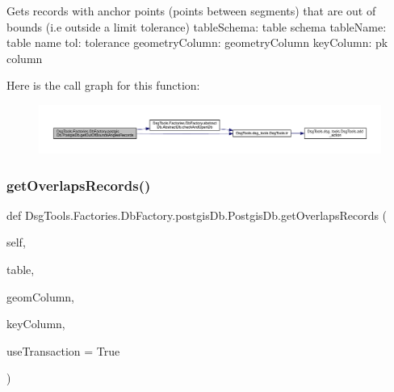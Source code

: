 \begin{DoxyVerb}Gets records with anchor points (points between segments) that are out of bounds (i.e outside a limit tolerance)
tableSchema: table schema
tableName: table name
tol: tolerance
geometryColumn: geometryColumn
keyColumn: pk column
\end{DoxyVerb}
 Here is the call graph for this function\+:
\nopagebreak
\begin{figure}[H]
\begin{center}
\leavevmode
\includegraphics[width=350pt]{class_dsg_tools_1_1_factories_1_1_db_factory_1_1postgis_db_1_1_postgis_db_a9e31c11791060c35255b94f5c36c9ce2_cgraph}
\end{center}
\end{figure}
\mbox{\label{class_dsg_tools_1_1_factories_1_1_db_factory_1_1postgis_db_1_1_postgis_db_ad78e09592b69cb6c6c4ff584d56f4c4d}} 
\subsubsection{\texorpdfstring{get\+Overlaps\+Records()}{getOverlapsRecords()}}
{\footnotesize\ttfamily def Dsg\+Tools.\+Factories.\+Db\+Factory.\+postgis\+Db.\+Postgis\+Db.\+get\+Overlaps\+Records (\begin{DoxyParamCaption}\item[{}]{self,  }\item[{}]{table,  }\item[{}]{geom\+Column,  }\item[{}]{key\+Column,  }\item[{}]{use\+Transaction = {\ttfamily True} }\end{DoxyParamCaption})}

